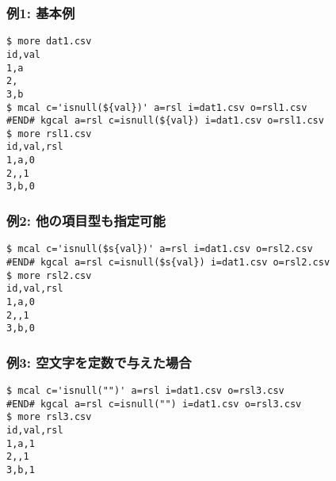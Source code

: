 \subsubsection*{例1: 基本例}



\begin{Verbatim}[baselinestretch=0.7,frame=single]
$ more dat1.csv
id,val
1,a
2,
3,b
$ mcal c='isnull(${val})' a=rsl i=dat1.csv o=rsl1.csv
#END# kgcal a=rsl c=isnull(${val}) i=dat1.csv o=rsl1.csv
$ more rsl1.csv
id,val,rsl
1,a,0
2,,1
3,b,0
\end{Verbatim}
\subsubsection*{例2: 他の項目型も指定可能}



\begin{Verbatim}[baselinestretch=0.7,frame=single]
$ mcal c='isnull($s{val})' a=rsl i=dat1.csv o=rsl2.csv
#END# kgcal a=rsl c=isnull($s{val}) i=dat1.csv o=rsl2.csv
$ more rsl2.csv
id,val,rsl
1,a,0
2,,1
3,b,0
\end{Verbatim}
\subsubsection*{例3: 空文字を定数で与えた場合}



\begin{Verbatim}[baselinestretch=0.7,frame=single]
$ mcal c='isnull("")' a=rsl i=dat1.csv o=rsl3.csv
#END# kgcal a=rsl c=isnull("") i=dat1.csv o=rsl3.csv
$ more rsl3.csv
id,val,rsl
1,a,1
2,,1
3,b,1
\end{Verbatim}
